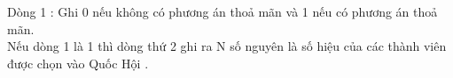 Dòng 1 : Ghi 0 nếu không có phương án thoả mãn và 1 nếu có phương án thoả mãn.   
\\   Nếu dòng 1 là 1 thì dòng thứ 2 ghi ra N số nguyên là số hiệu của các thành viên được chọn vào Quốc Hội .  

\